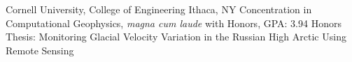 
        {Cornell University, College of Engineering}
        {Ithaca, NY}
        {Concentration in Computational Geophysics, \textit{magna cum laude} with Honors, GPA: 3.94} %
        {Honors Thesis: Monitoring Glacial Velocity Variation in the Russian High Arctic Using Remote Sensing}
